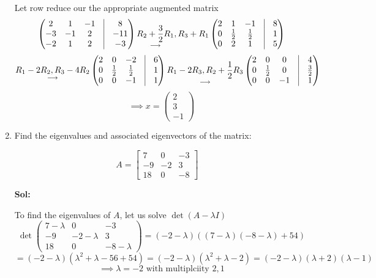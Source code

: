 \documentclass[11pt]{article}
\begin{document}
\begin{enumerate}
  Let row reduce our the appropriate augmented matrix 
  \[\begin{pmatrix}
    2 & 1 & -1 & \vline & 8\\
    -3 & -1 & 2 & \vline & -11\\
    -2 & 1 & 2 & \vline & -3
  \end{pmatrix} \underset{\longrightarrow}{R_2 + \frac{3}{2}R_1}, R_3 + R_1 \begin{pmatrix}
    2 & 1 & -1 & \vline & 8\\
    0 & \frac{1}{2} & \frac{1}{2} & \vline & 1\\
    0 & 2 & 1 & \vline & 5
  \end{pmatrix}\]
  \[\underset{\longrightarrow}{R_1 - 2R_2, R_3 - 4R_2} \begin{pmatrix}
    2 & 0 & -2 & \vline & 6\\
    0 & \frac{1}{2} & \frac{1}{2} & \vline & 1\\
    0 & 0 & -1 & \vline & 1
  \end{pmatrix} \underset{\longrightarrow}{R_1 - 2R_3, R_2 + \frac{1}{2}R_3} \begin{pmatrix}
    2 & 0 & 0 & \vline & 4 \\
    0 & \frac{1}{2} & 0 & \vline & \frac{3}{2}\\
    0 & 0 & -1 & \vline & 1
  \end{pmatrix}\]
  \[ \implies x = \begin{pmatrix}
    2 \\ 3 \\ -1
  \end{pmatrix}\]
  \newpage

\item Find the eigenvalues and associated eigenvectors of the matrix:

\[A = \left[\begin{array}{rrr} 7 & 0 & -3\\ -9 & -2 & 3 \\ 18 & 0 & -8 \end{array}\right] \quad\]

\textbf{Sol:}
  
  To find the eigenvalues of $A$, let us solve $\det(A - \lambda I)$
  \[\det\begin{pmatrix}
    7- \lambda & 0 & -3 \\
    -9 & -2 - \lambda & 3\\
    18 & 0 & -8 - \lambda 
  \end{pmatrix} = (-2-\lambda)((7-\lambda)(-8-\lambda) + 54)\]
  \[ = (-2-\lambda)(\lambda^2 + \lambda - 56 + 54) = (-2-\lambda)(\lambda^2 + \lambda -2) = (-2-\lambda)(\lambda+2)(\lambda-1)\]
  \[\implies \lambda = -2 \text{ with multiplciity 2}, 1\]


\end{enumerate}
\end{document}
